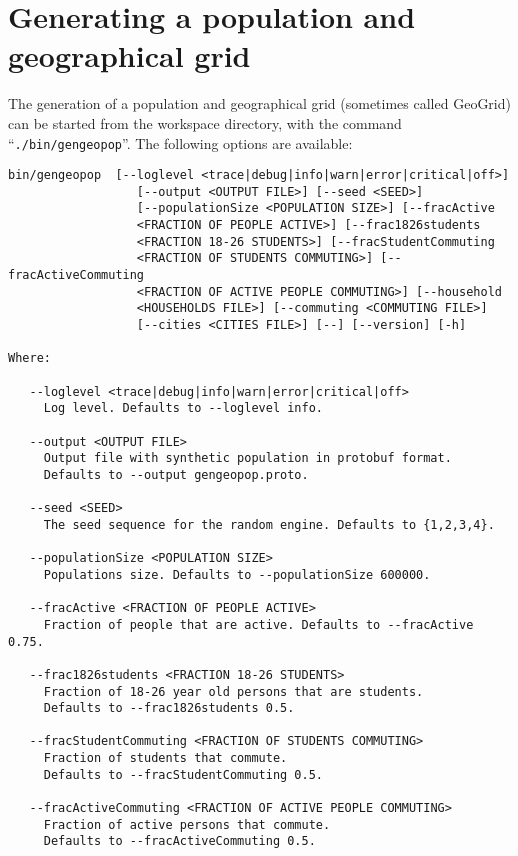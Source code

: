 \section{Generating a population and geographical grid}

 The generation of a population and geographical grid (sometimes called GeoGrid) can be started from the workspace directory, with the command \mbox{``\texttt{./bin/gengeopop}''}. The following options are available:
\begin{verbatim}
bin/gengeopop  [--loglevel <trace|debug|info|warn|error|critical|off>]
                  [--output <OUTPUT FILE>] [--seed <SEED>]
                  [--populationSize <POPULATION SIZE>] [--fracActive
                  <FRACTION OF PEOPLE ACTIVE>] [--frac1826students
                  <FRACTION 18-26 STUDENTS>] [--fracStudentCommuting
                  <FRACTION OF STUDENTS COMMUTING>] [--fracActiveCommuting
                  <FRACTION OF ACTIVE PEOPLE COMMUTING>] [--household
                  <HOUSEHOLDS FILE>] [--commuting <COMMUTING FILE>]
                  [--cities <CITIES FILE>] [--] [--version] [-h]
 
Where: 
 
   --loglevel <trace|debug|info|warn|error|critical|off>
     Log level. Defaults to --loglevel info.
 
   --output <OUTPUT FILE>
     Output file with synthetic population in protobuf format.             
     Defaults to --output gengeopop.proto.
 
   --seed <SEED>
     The seed sequence for the random engine. Defaults to {1,2,3,4}.
 
   --populationSize <POPULATION SIZE>
     Populations size. Defaults to --populationSize 600000.
 
   --fracActive <FRACTION OF PEOPLE ACTIVE>
     Fraction of people that are active. Defaults to --fracActive 0.75.
 
   --frac1826students <FRACTION 18-26 STUDENTS>
     Fraction of 18-26 year old persons that are students.                 
     Defaults to --frac1826students 0.5.
 
   --fracStudentCommuting <FRACTION OF STUDENTS COMMUTING>
     Fraction of students that commute.                                    
     Defaults to --fracStudentCommuting 0.5.
 
   --fracActiveCommuting <FRACTION OF ACTIVE PEOPLE COMMUTING>
     Fraction of active persons that commute.                              
     Defaults to --fracActiveCommuting 0.5.
 

\end{verbatim}

